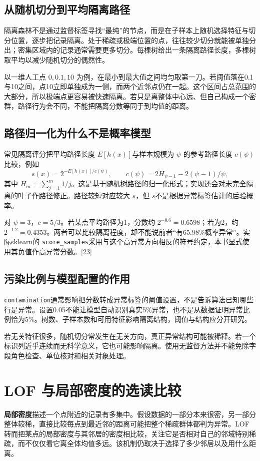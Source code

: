 \subsection{从随机切分到平均隔离路径}
隔离森林不是通过监督标签寻找“最纯”的节点，而是在子样本上随机选择特征与切分位置，逐步把记录隔离。处于稀疏或极端位置的点，往往较少切分就能被单独分出；密集区域内的记录通常需要更多切分。每棵树给出一条隔离路径长度，多棵树取平均以减少随机切分的偶然性。

以一维人工点 $0,0.1,10$ 为例，在最小到最大值之间均匀取第一刀。若阈值落在0.1与10之间，点10立即单独成为一侧，而两个近邻点仍在一起。这个区间占总范围的大部分，所以极端点更容易被快速隔离。若只是离整体中心远、但自己构成一个密群，路径行为会不同，不能把隔离分数等同于到均值的距离。

\subsection{路径归一化为什么不是概率模型}
常见隔离评分把平均路径长度 $E[h(x)]$与样本规模为 $\psi$ 的参考路径长度 $c(\psi)$比较，例如
\[
s(x)=2^{-E[h(x)]/c(\psi)},\qquad
c(\psi)=2H_{\psi-1}-2(\psi-1)/\psi,
\]
其中 $H_m=\sum_{j=1}^{m}1/j$。这是基于随机树路径的归一化形式；实现还会对未完全隔离的叶子作路径修正。路径较短对应较大 $s$，但 $s$不是根据异常标签估计的后验概率。

对 $\psi=3$，$c=5/3$。若某点平均路径为1，分数约 $2^{-0.6}=0.6598$；若为2，约 $2^{-1.2}=0.4353$。两者可以比较隔离程度，却不能说前者“有65.98\%概率异常”。实际sklearn的 \texttt{score\_samples}采用与这个高异常方向相反的符号约定，本书显式使用其负值作高异常分数。[23]

\subsection{污染比例与模型配置的作用}
\texttt{contamination}通常影响把分数转成异常标签的阈值设置，不是告诉算法已知哪些行是异常。设置0.05不能让模型自动识别真实5\%异常，也不是从数据证明异常比例恰为5\%。树数、子样本数和可用特征影响隔离结构，阈值与结构应分开研究。

若无关特征很多，随机切分常发生在无关方向，真正异常结构可能被稀释。若一个标识列近乎连续而无科学意义，它也可能影响隔离。使用无监督方法并不能免除字段角色检查、单位核对和相关对象处理。

\section{LOF 与局部密度的选读比较}

\textbf{局部密度}描述一个点附近的记录有多集中。假设数据的一部分本来很密，另一部分整体较稀，直接比较每点到最近邻的距离可能把整个稀疏群体都判为异常。LOF转而把某点的局部密度与其邻居的密度相比较，关注它是否相对自己的邻域特别稀疏，而不仅仅看它离全体均值多远。该机制仍取决于选择了多少邻居以及用什么距离。

